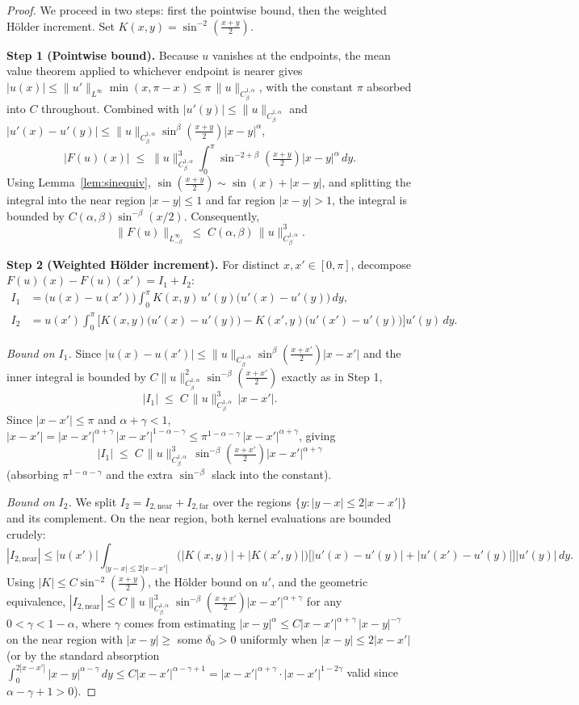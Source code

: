 \documentclass{amsart}
\begin{document}
\begin{proof}
We proceed in two steps: first the pointwise bound, then the weighted Hölder increment. Set $K(x,y)=\sin^{-2}(\frac{x+y}{2})$.

\textbf{Step 1 (Pointwise bound).}
Because $u$ vanishes at the endpoints, the mean value theorem applied to whichever endpoint is nearer gives $|u(x)|\le \|u'\|_{L^\infty}\min(x,\pi-x)\le \pi\,\|u\|_{C^{1,\alpha}_\beta}$, with the constant $\pi$ absorbed into $C$ throughout. Combined with $|u'(y)|\le \|u\|_{C^{1,\alpha}_\beta}$ and $|u'(x)-u'(y)| \le \|u\|_{C^{1,\alpha}_\beta} \sin^\beta(\frac{x+y}{2})|x-y|^\alpha$,
\[
|F(u)(x)|
\;\le\;
\|u\|_{C^{1,\alpha}_\beta}^3
\int_0^\pi
\sin^{-2+\beta}\!\left(\tfrac{x+y}{2}\right)|x-y|^\alpha\,dy.
\]
Using Lemma~\ref{lem:sinequiv}, $\sin(\frac{x+y}{2})\sim \sin(x)+|x-y|$, and splitting the integral into the near region $|x-y|\le 1$ and far region $|x-y|>1$, the integral is bounded by $C(\alpha,\beta)\sin^{-\beta}(x/2)$. Consequently,
\[
\|F(u)\|_{L^\infty_{-\beta}}
\;\le\;
C(\alpha,\beta)\,\|u\|_{C^{1,\alpha}_\beta}^3.
\]

\textbf{Step 2 (Weighted Hölder increment).}
For distinct $x,x'\in[0,\pi]$, decompose $F(u)(x)-F(u)(x') = I_1+I_2$:
\begin{align*}
I_1 &= \big(u(x)-u(x')\big) \int_0^\pi K(x,y)\,u'(y)\big(u'(x)-u'(y)\big)\,dy,\\
I_2 &= u(x') \int_0^\pi \Big[ K(x,y)\big(u'(x)-u'(y)\big) - K(x',y)\big(u'(x')-u'(y)\big) \Big]u'(y)\,dy.
\end{align*}

\emph{Bound on $I_1$.} Since $|u(x)-u(x')|\le \|u\|_{C^{1,\alpha}_\beta}\sin^\beta(\frac{x+x'}{2})|x-x'|$ and the inner integral is bounded by $C\|u\|_{C^{1,\alpha}_\beta}^2 \sin^{-\beta}(\frac{x+x'}{2})$ exactly as in Step 1,
\[
|I_1|\;\le\; C\,\|u\|_{C^{1,\alpha}_\beta}^3\,|x-x'|.
\]
Since $|x-x'|\le\pi$ and $\alpha+\gamma<1$,
$|x-x'| = |x-x'|^{\alpha+\gamma}\,|x-x'|^{1-\alpha-\gamma}\le \pi^{1-\alpha-\gamma}\,|x-x'|^{\alpha+\gamma}$, giving
\[
|I_1|\;\le\; C\,\|u\|_{C^{1,\alpha}_\beta}^3\,\sin^{-\beta}\!\left(\tfrac{x+x'}{2}\right)|x-x'|^{\alpha+\gamma}
\]
(absorbing $\pi^{1-\alpha-\gamma}$ and the extra $\sin^{-\beta}$ slack into the constant).

\emph{Bound on $I_2$.} We split $I_2 = I_{2,\mathrm{near}}+I_{2,\mathrm{far}}$ over the regions $\{y:|y-x|\le 2|x-x'|\}$ and its complement. On the near region, both kernel evaluations are bounded crudely:
\[
|I_{2,\mathrm{near}}|\le |u(x')|\int_{|y-x|\le 2|x-x'|}\!\Big(|K(x,y)|+|K(x',y)|\Big)\big[|u'(x)-u'(y)|+|u'(x')-u'(y)|\big]|u'(y)|\,dy.
\]
Using $|K|\le C\sin^{-2}(\frac{x+y}{2})$, the Hölder bound on $u'$, and the geometric equivalence,
$|I_{2,\mathrm{near}}|\le C\|u\|_{C^{1,\alpha}_\beta}^3\sin^{-\beta}(\frac{x+x'}{2})|x-x'|^{\alpha+\gamma}$ for any $0<\gamma<1-\alpha$, where $\gamma$ comes from estimating $|x-y|^\alpha\le C|x-x'|^{\alpha+\gamma}\,|x-y|^{-\gamma}$ on the near region with $|x-y|\ge $ some $\delta_0>0$ uniformly when $|x-y|\le 2|x-x'|$ (or by the standard absorption $\int_0^{2|x-x'|}|x-y|^{\alpha-\gamma}\,dy\le C|x-x'|^{\alpha-\gamma+1}=|x-x'|^{\alpha+\gamma}\cdot|x-x'|^{1-2\gamma}$ valid since $\alpha-\gamma+1>0$).


\end{proof}
\end{document}
